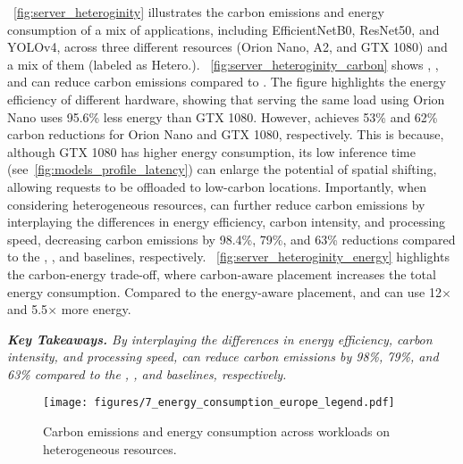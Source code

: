 ~\autoref{fig:server_heteroginity} illustrates the carbon emissions and energy consumption of a mix of applications, including EfficientNetB0, ResNet50, and YOLOv4, across three different resources (Orion Nano, A2, and GTX 1080) and a mix of them (labeled as Hetero.). ~\autoref{fig:server_heteroginity_carbon} shows \energyaware, \intensityaware, and \proposedsystem can reduce carbon emissions compared to \latencyaware. The figure highlights the energy efficiency of different hardware, showing that serving the same load using Orion Nano uses 95.6\% less energy than GTX 1080. However, \proposedsystem achieves 53\% and 62\% carbon reductions for Orion Nano and GTX 1080, respectively.  This is because, although GTX 1080 has higher energy consumption, its low inference time (see~\autoref{fig:models_profile_latency})  can enlarge the potential of spatial shifting, allowing requests to be offloaded to low-carbon locations.  Importantly, when considering heterogeneous resources, \proposedsystem can further reduce carbon emissions by interplaying the differences in energy efficiency, carbon intensity, and processing speed, decreasing carbon emissions by 98.4\%, 79\%, and 63\% reductions compared to the \latencyaware, \intensityaware, and \energyaware baselines, respectively. ~\autoref{fig:server_heteroginity_energy} 
highlights the carbon-energy trade-off, where carbon-aware placement increases the total energy consumption.  Compared to the energy-aware placement, \intensityaware and \proposedsystem can use 12$\times$ and 5.5$\times$ more energy. 


\noindent \textit{\textbf{Key Takeaways.} 
By interplaying the differences in energy efficiency, carbon intensity, and processing speed,  \proposedsystem can reduce carbon emissions by 98\%, 79\%, and 63\% compared to the \latencyaware, \intensityaware, and \energyaware baselines, respectively. 
}

\begin{figure}[tb]
    \centering
    \texttt{[image: figures/7\_energy\_consumption\_europe\_legend.pdf]} \\ 
    \hfill
    \caption{Carbon emissions and energy consumption across workloads on heterogeneous resources. }
    \label{fig:server_heteroginity}
\end{figure}


